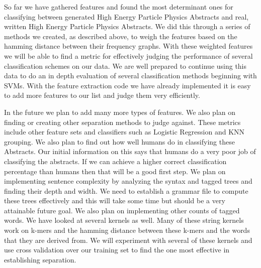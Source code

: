 
So far we have gathered features and found the most determinant ones for classifying between generated High Energy Particle Physics Abstracts and real, written High Energy Particle Physics Abstracts.  We did this through a series of methods we created, as described above, to weigh the features based on the hamming distance between their frequency graphs.  With these weighted features we will be able to find a metric for effectively judging the performance of several classification schemes on our data.  We are well prepared to continue using this data to do an in depth evaluation of several classification methods beginning with SVMs.  With the feature extraction code we have already implemented it is easy to add more features to our list and judge them very efficiently.

In the future we plan to add many more types of features.  We also plan on finding or creating other separation methods to judge against.  These metrics include other feature sets and classifiers such as Logistic Regression and KNN grouping.  We also plan to find out how well humans do in classifying these Abstracts.  Our initial information on this says that humans do a very poor job of classifying the abstracts.  If we can achieve a higher correct classification percentage than humans then that will be a good first step.  We plan on implementing sentence complexity by analyzing the syntax and tagged trees and finding their depth and width.  We need to establish a grammar file to compute these trees effectively and this will take some time but should be a very attainable future goal.  We also plan on implementing other counts of tagged words.  We have looked at several kernels as well.  Many of these string kernels work on k-mers and the hamming distance between these k-mers and the words that they are derived from.  We will experiment with several of these kernels and use cross validation over our training set to find the one most effective in establishing separation.